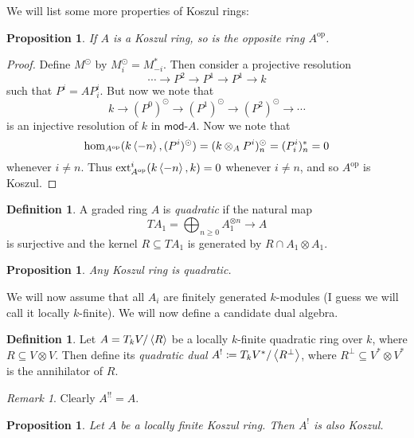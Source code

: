 \documentclass[leqno, openany]{memoir}
\newtheorem{prop}[thm]{Proposition}
\theoremstyle{definition}
\newtheorem{defn}[thm]{Definition}
\theoremstyle{remark}
\newtheorem{rmk}[thm]{Remark}
\theoremstyle{plain}
\theoremstyle{definition}
\theoremstyle{remark}
\newcommand{\mr}[1]{\mathrm{#1}}
\newcommand{\ms}[1]{\mathsf{#1}}
\DeclareMathOperator{\ext}{ext}
\begin{document}
We will list some more properties of Koszul rings:
\begin{prop}
    If $A$ is a Koszul ring, so is the opposite ring $A^{\mr{op}}$.
\end{prop}

\begin{proof}
    Define $M^{\odot}$ by $M^{\odot}_i = M_{-i}^*$. Then consider a projective resolution
    \[ \cdots \to P^2 \to P^1 \to P^1 \to k \]
    such that $P^i = AP_i^i$. But now we note that
    \[ k \to (P^0)^{\odot} \to (P^1)^{\odot} \to (P^2)^{\odot} \to \cdots \]
    is an injective resolution of $k$ in $\ms{mod}\text{-}A$. Now we note that
    \[ \hom_{A^{\mr{op}}}(k\ev{-n}, (P^i)^{\odot}) = (k \otimes_A P^i)_n^{\odot} = (P_i^i)_n^* = 0 \]
    whenever $i \neq n$. Thus $\ext_{A^{\mr{op}}}^i(k\ev{-n}, k) = 0$ whenever $i \neq n$, and so $A^{\mr{op}}$ is Koszul.
\end{proof}

\begin{defn}
    A graded ring $A$ is \textit{quadratic} if the natural map
    \[ T A_1 = \bigoplus_{n \geq 0} A_1^{\otimes n} \to A \]
    is surjective and the kernel $R \subseteq T A_1$ is generated by $R \cap A_1 \otimes A_1$.
\end{defn}

\begin{prop}
    Any Koszul ring is quadratic.
\end{prop}

We will now assume that all $A_i$ are finitely generated $k$-modules (I guess we will call it locally $k$-finite). We will now define a candidate dual algebra.
\begin{defn}
    Let $A = T_k V / \ev{R}$ be a locally $k$-finite quadratic ring over $k$, where $R \subseteq V \otimes V$. Then define its \textit{quadratic dual} $A^! \coloneqq T_k V^* / \ev{R^{\perp}}$, where $R^{\perp} \subseteq V^* \otimes V^*$ is the annihilator of $R$.
\end{defn}

\begin{rmk}
    Clearly $A^{!!} = A$.
\end{rmk}

\begin{prop}
    Let $A$ be a locally finite Koszul ring. Then $A^!$ is also Koszul.
\end{prop}
\end{document}
